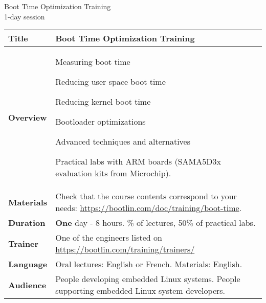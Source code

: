 \documentclass[a4paper,12pt,obeyspaces,spaces,hyphens]{article}
\begin{document}
\thispagestyle{fancy}

\setlength{\arrayrulewidth}{0.8pt}

\begin{center}
\LARGE
Boot Time Optimization Training\\
\large
1-day session
\end{center}
\vspace{1cm}

\small
{}

 {
  \begin{tabularx}{\textwidth}{|g|h|}
    {\bf Title} & {\bf Boot Time Optimization Training}\\
    \hline

    {\bf Overview} &
    Measuring boot time \par
    Reducing user space boot time \par
    Reducing kernel boot time \par
    Bootloader optimizations \par
    Advanced techniques and alternatives \par
    Practical labs with ARM boards (SAMA5D3x evaluation kits from
    Microchip).\\
    \hline
    {\bf Materials} &
    Check that the course contents correspond to your needs:
    \newline \url{https://bootlin.com/doc/training/boot-time}. \\
    \hline

    {\bf Duration} & {\bf One} day - 8 hours.
    \% of lectures, 50\% of practical labs. \\
    \hline

    {\bf Trainer} & One of the engineers listed on
    \newline \url{https://bootlin.com/training/trainers/}\\
    \hline

    {\bf Language} & Oral lectures: English or French.
    \newline Materials: English.\\
    \hline

    {\bf Audience} & People developing embedded Linux systems.
    \newline People supporting embedded Linux system developers. \\
    \hline


\end{tabularx}}
\end{document}
